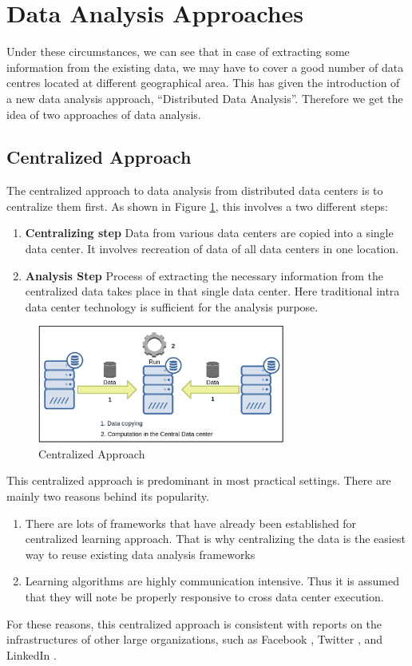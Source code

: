 \section{Data Analysis Approaches }
Under these circumstances, we can see that in case of extracting some information from the existing data, we may have to cover a good number of data centres located at different geographical area. This has given the introduction of a new data analysis approach, ``Distributed Data Analysis''. Therefore we get the idea of two approaches of data analysis.

\subsection{Centralized Approach}
The centralized approach to data analysis from distributed data centers is to centralize them first. As shown in Figure \ref{centralized}, this involves a two different steps: 


\begin{enumerate}

\item \textbf{Centralizing step} Data from various data centers are copied into a single data center. It involves recreation of data of all data centers in one location.

\item \textbf{Analysis Step} Process of extracting the necessary information from the centralized data takes place in that single data center. Here traditional intra data center technology is sufficient for the analysis purpose.

\end{enumerate}

\begin{figure}[!htbp]
  \centering
	\includegraphics[width=3.2in]{figures/1.png}
	\caption{Centralized Approach}
	\label{centralized}
\end{figure}


This centralized approach is predominant in most practical settings. 
There are mainly two reasons behind its popularity. 
\begin{enumerate}
\item There are lots of frameworks that have already been established for centralized learning approach. That is why centralizing the data is the easiest way to reuse existing data analysis frameworks \cite{1,2,3}
\item Learning algorithms are highly communication intensive. Thus it is assumed that they will note be properly responsive to cross data center execution.
\end{enumerate}
For these reasons, this centralized approach is consistent with reports on the infrastructures of other large organizations, such as Facebook \cite{4}, Twitter \cite{5}, and LinkedIn \cite{6}. 

